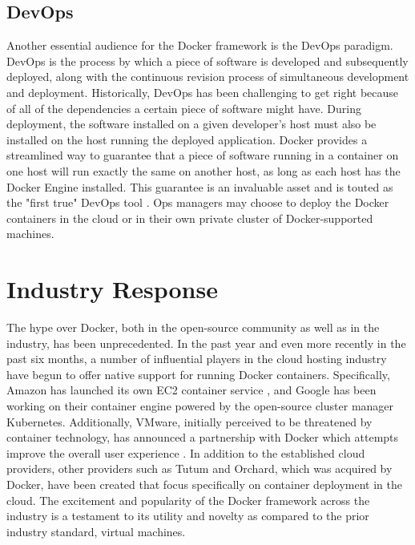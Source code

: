 \subsection{DevOps}
Another essential audience for the Docker framework is the DevOps paradigm. DevOps is the process by which a piece of software is developed and subsequently deployed, along with the continuous revision process of simultaneous development and deployment. Historically, DevOps has been challenging to get right because of all of the dependencies a certain piece of software might have. During deployment, the software installed on a given developer's host must also be installed on the host running the deployed application. Docker provides a streamlined way to guarantee that a piece of software running in a container on one host will run exactly the same on another host, as long as each host has the Docker Engine installed. This guarantee is an invaluable asset and is touted as the "first true" DevOps tool \cite{devops}. Ops managers may choose to deploy the Docker containers in the cloud or in their own private cluster of Docker-supported machines.


\section{Industry Response}\label{ch2:industry}

The hype over Docker, both in the open-source community as well as in the industry, has been unprecedented. In the past year and even more recently in the past six months, a number of influential players in the cloud hosting industry have begun to offer native support for running Docker containers. Specifically, Amazon has launched its own EC2 container service \cite{aws}, and Google has been working on their container engine powered by the open-source cluster manager Kubernetes. Additionally, VMware, initially perceived to be threatened by container technology, has announced a partnership with Docker which attempts improve the overall user experience \cite{vmware}. In addition to the established cloud providers, other providers such as Tutum and Orchard, which was acquired by Docker, have been created that focus specifically on container deployment in the cloud. The excitement and popularity of the Docker framework across the industry is a testament to its utility and novelty as compared to the prior industry standard, virtual machines.

